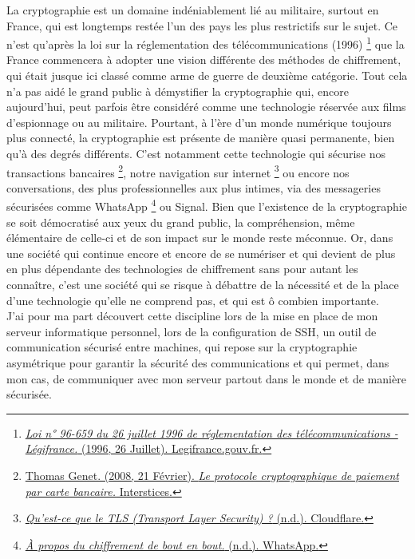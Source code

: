 \documentclass{article}
\begin{document}
\hspace{2em} La cryptographie est un domaine indéniablement lié au militaire, surtout en France, qui est longtemps restée l'un des pays les plus restrictifs sur le sujet. Ce n'est qu'après la loi sur la réglementation des télécommunications (1996)
\footnote{\href{https://www.legifrance.gouv.fr/loda/id/JORFTEXT000000733177}{\textit{Loi n° 96-659 du 26 juillet 1996 de réglementation des télécommunications - Légifrance.} (1996, 26 Juillet). Legifrance.gouv.fr.}}
que la France commencera à adopter une vision différente des méthodes de chiffrement, qui était jusque ici classé comme arme de guerre de deuxième catégorie. Tout cela n'a pas aidé le grand public à démystifier la cryptographie qui, encore aujourd'hui, peut parfois être considéré comme une technologie réservée aux films d'espionnage ou au militaire. Pourtant, à l'ère d'un monde numérique toujours plus connecté, la cryptographie est présente de manière quasi permanente, bien qu'à des degrés différents. C'est notamment cette technologie qui sécurise nos transactions bancaires
\footnote{\href{https://interstices.info/le-protocole-cryptographique-de-paiement-par-carte-bancaire/}{Thomas Genet. (2008, 21 Février). \textit{Le protocole cryptographique de paiement par carte bancaire.} Interstices.}},
notre navigation sur internet
\footnote{\href{https://www.cloudflare.com/fr-fr/learning/ssl/transport-layer-security-tls/}{\textit{Qu’est-ce que le TLS (Transport Layer Security) ?} (n.d.). Cloudflare.}}
ou encore nos conversations, des plus professionnelles aux plus intimes, via des messageries sécurisées comme WhatsApp
\footnote{\href{https://faq.whatsapp.com/820124435853543}{\textit{À propos du chiffrement de bout en bout.} (n.d.). WhatsApp.}}
ou Signal.
Bien que l'existence de la cryptographie se soit démocratisé aux yeux du grand public, la compréhension, même élémentaire de celle-ci et de son  impact sur le monde reste méconnue. Or, dans une société qui continue encore et encore de se numériser et qui devient de plus en plus dépendante des technologies de chiffrement sans pour autant les connaître, c'est une société qui se risque à débattre de la nécessité et de la place d'une technologie qu'elle ne comprend pas, et qui est ô combien importante. \\

J'ai pour ma part découvert cette discipline lors de la mise en place de mon serveur informatique personnel, lors de la configuration de SSH, un outil de communication sécurisé entre machines, qui repose sur la cryptographie asymétrique pour garantir la sécurité des communications et qui permet, dans mon cas, de communiquer avec mon serveur partout dans le monde et de manière sécurisée. \\
\end{document}
